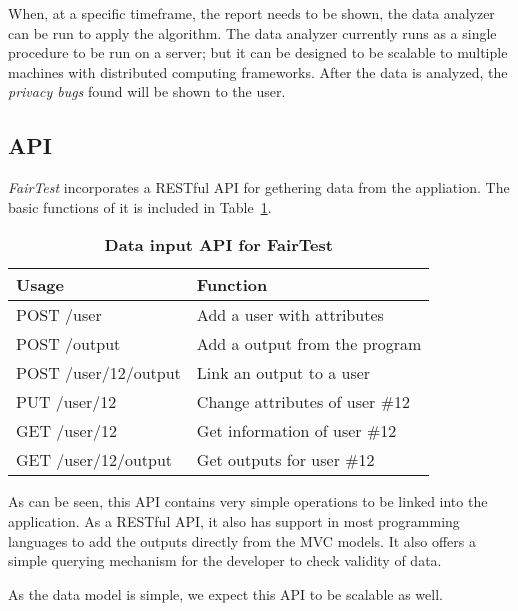 When, at a specific timeframe, the report needs to be shown, the data analyzer
can be run to apply the algorithm. The data analyzer currently runs as a single
procedure to be run on a server; but it can be designed to be scalable to
multiple machines with distributed computing frameworks. After the data is
analyzed, the \textit{privacy bugs} found will be shown to the user.

\subsection{API}

\textit{FairTest} incorporates a RESTful API for gethering data from the
appliation. The basic functions of it is included in Table~\ref{tab:fairtestApi}.

\begin{table}[t]
{
 \scriptsize
  \renewcommand{\arraystretch}{1.5}
  \begin{tabular}{ l | l }
    Usage & Function \\
    \hline
    POST /user & Add a user with attributes \\
    POST /output & Add a output from the program \\
    POST /user/12/output & Link an output to a user\\
    \hline
    PUT /user/12 & Change attributes of user \#12 \\
    \hline
    GET /user/12 & Get information of user \#12 \\
    GET /user/12/output & Get outputs for user \#12 \\
  \end{tabular}
  \caption{\bf Data input API for FairTest} 
  \label{tab:fairtestApi}
}
\end{table}

As can be seen, this API contains very simple operations to be linked into
the application. As a RESTful API, it also has support in most programming
languages to add the outputs directly from the MVC models. It also offers
a simple querying mechanism for the developer to check validity of data.

As the data model is simple, we expect this API to be scalable as well.

